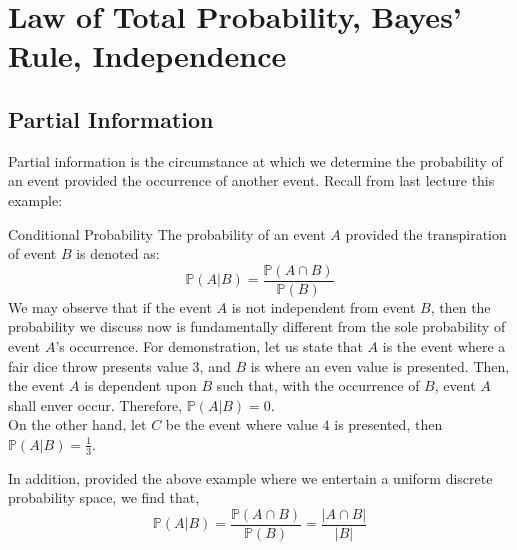 \chapter{Law of Total Probability, Bayes' Rule, Independence}

\section{Partial Information}
Partial information is the circumstance at which we determine the probability of an event provided the occurrence of another event.
Recall from last lecture this example:
\begin{ln-define}{Conditional Probability}{}
    The probability of an event $A$ provided the transpiration of event $B$ is denoted as:
    \[
        \mathbb{P}(A | B) = \frac{\mathbb{P}(A \cap B)}{\mathbb{P}(B)}
    \]
    We may observe that if the event $A$ is not independent from event $B$, then the probability we discuss now is fundamentally different from the sole probability of event $A$'s occurrence.
    \tcblower
    For demonstration, let us state that $A$ is the event where a fair dice throw presents value $3$, and $B$ is where an even value is presented. Then, the event $A$ is dependent upon $B$ such that, with the occurrence of $B$, event $A$ shall enver occur.
    Therefore, $\mathbb{P}(A | B) = 0$. \\
    On the other hand, let $C$ be the event where value $4$ is presented, then $\mathbb{P}(A|B) = \frac{1}{3}$.
\end{ln-define}
In addition, provided the above example where we entertain a uniform discrete probability space, we find that,
\[
    \mathbb{P}(A | B) = \frac{\mathbb{P}(A \cap B)}{\mathbb{P}(B)} = \frac{|A \cap B|}{|B|}
\]

